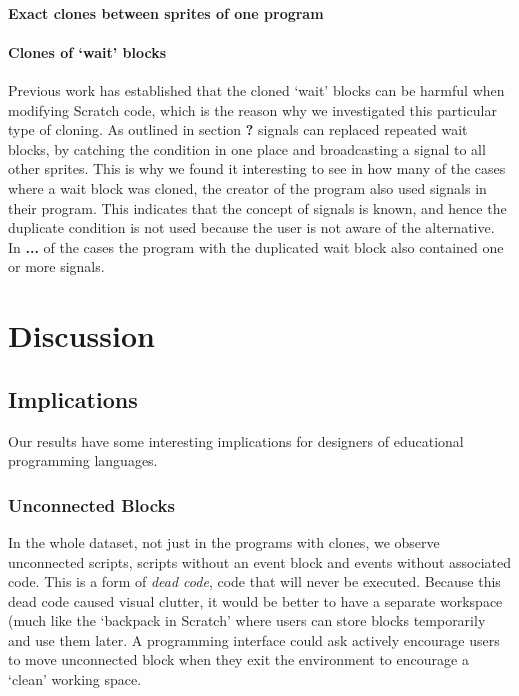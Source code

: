 \documentclass{sig-alternate}
\newcommand{\todo}[1]{\textbf{#1}}
\begin{document}
\paragraph{Exact clones between sprites of one program}

\paragraph{Clones of `wait' blocks}
Previous work has established that the cloned `wait' blocks can be harmful when modifying Scratch code, which is the reason why we investigated this particular type of cloning. As outlined in section \todo{?} signals can replaced repeated wait blocks, by catching the condition in one place and broadcasting a signal to all other sprites. This is why we found it interesting to see in how many of the cases where a wait block was cloned, the creator of the program also used signals in their program. This indicates that the concept of signals is known, and hence the duplicate condition is not used because the user is not aware of the alternative. In \todo{...} of the cases the program with the duplicated wait block also contained one or more signals. 



\section{Discussion}

\subsection{Implications}
Our results have some interesting implications for designers of educational programming languages. 

\subsubsection{Unconnected Blocks}
In the whole dataset, not just in the programs with clones, we observe unconnected scripts, scripts without an event block and events without associated code. This is a form of \emph{dead code}, code that will never be executed. Because this dead code caused visual clutter, it would be better to have a separate workspace (much like the `backpack in Scratch' where users can store blocks temporarily and use them later. A programming interface could ask actively encourage users to move unconnected block when they exit the environment to encourage a `clean' working space. 
\end{document}

